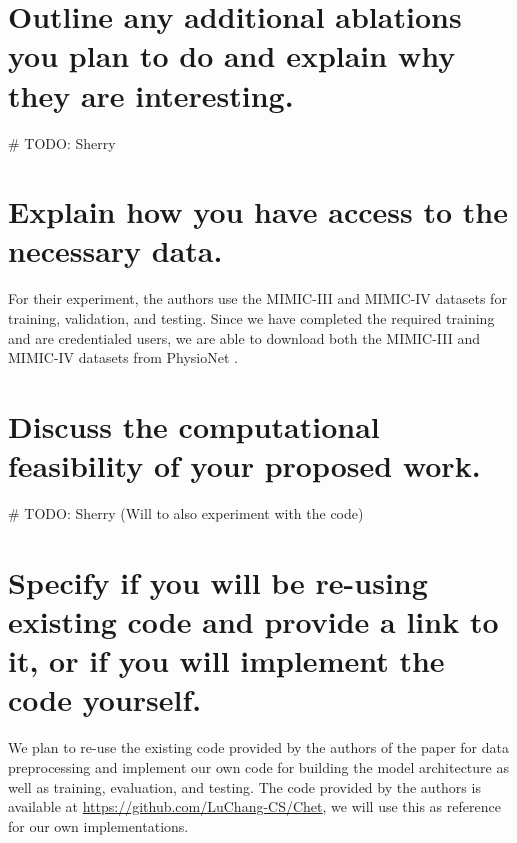 \documentclass[11pt,a4paper]{article}
\begin{document}
\section{Outline any additional ablations you plan to do and
explain why they are interesting.}
\# TODO: Sherry

\section{Explain how you have access to the necessary data.}
For their experiment, the authors use the MIMIC-III \cite{mimic3} and MIMIC-IV
\cite{mimic4} datasets for training, validation, and testing. Since we have
completed the required training and are credentialed users, we are able to
download both the MIMIC-III and MIMIC-IV datasets from PhysioNet
\cite{physionet}.

\section{Discuss the computational feasibility of your proposed work.}
\# TODO: Sherry (Will to also experiment with the code)

\section{Specify if you will be re-using existing code and provide a link to it,
or if you will implement the code yourself.} 
We plan to re-use the existing code provided by the authors of the paper for
data preprocessing and implement our own code for building the model
architecture as well as training, evaluation, and testing. The code provided by
the authors is available at \url {https://github.com/LuChang-CS/Chet}, we will
use this as reference for our own implementations.




\end{document}
